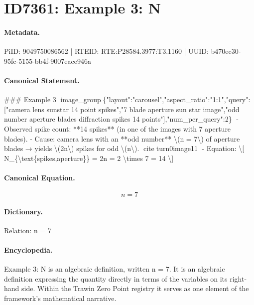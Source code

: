 \section*{ID7361: Example 3: N}
\paragraph{Metadata.}
PiID: 9049750086562 | RTEID: RTE:P28584.3977:T3.1160 | UUID: b470ec30-95fc-5155-bb4f-9007eace946a

\paragraph{Canonical Statement.}
\#\#\# Example 3 image\_group\{"layout":"carousel","aspect\_ratio":"1:1","query":["camera lens sunstar 14 point spikes","7 blade aperture sun star image","odd number aperture blades diffraction spikes 14 points"],"num\_per\_query":2\} - Observed spike count: **14 spikes** (in one of the images with 7 aperture blades). - Cause: camera lens with an **odd number** \textbackslash{}(n = 7\textbackslash{}) of aperture blades → yields \textbackslash{}(2n\textbackslash{}) spikes for odd \textbackslash{}(n\textbackslash{}). citeturn0image11 - Equation: \textbackslash{}[ N\_\{\textbackslash{}text\{spikes,aperture\}\} = 2n = 2 \textbackslash{}times 7 = 14 \textbackslash{}]

\paragraph{Canonical Equation.}
\[
n = 7
\]

\paragraph{Dictionary.}
Relation: n = 7

\paragraph{Encyclopedia.}
Example 3: N is an algebraic definition, written n = 7. It is an algebraic definition expressing the quantity directly in terms of the variables on its right-hand side. Within the Trawin Zero Point registry it serves as one element of the framework's mathematical narrative.
